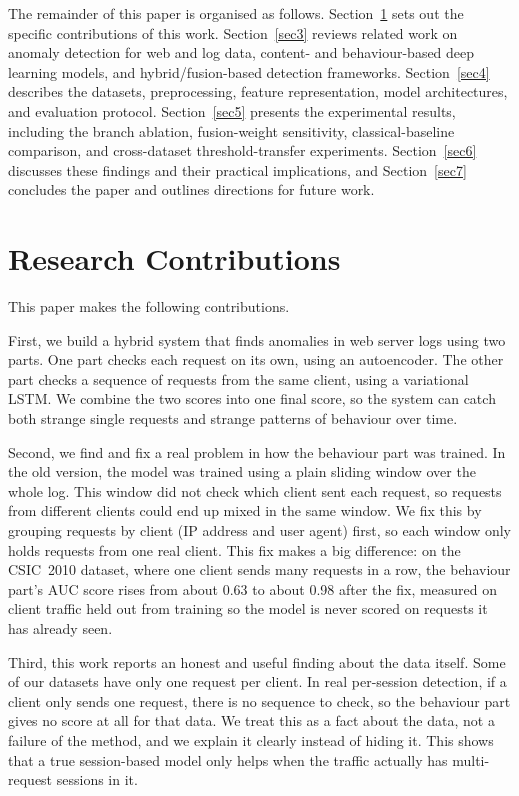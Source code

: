 \documentclass[futureinternet,article,submit,moreauthors]{Definitions/mdpi}
\begin{document}
The remainder of this paper is organised as follows. Section~\ref{sec2} sets out the specific contributions of this work. Section~\ref{sec3} reviews related work on anomaly detection for web and log data, content- and behaviour-based deep learning models, and hybrid/fusion-based detection frameworks. Section~\ref{sec4} describes the datasets, preprocessing, feature representation, model architectures, and evaluation protocol. Section~\ref{sec5} presents the experimental results, including the branch ablation, fusion-weight sensitivity, classical-baseline comparison, and cross-dataset threshold-transfer experiments. Section~\ref{sec6} discusses these findings and their practical implications, and Section~\ref{sec7} concludes the paper and outlines directions for future work.

\section{Research Contributions} \label{sec2}

This paper makes the following contributions.

First, we build a hybrid system that finds anomalies in web server logs using two parts. One part checks each request on its own, using an autoencoder. The other part checks a sequence of requests from the same client, using a variational LSTM. We combine the two scores into one final score, so the system can catch both strange single requests and strange patterns of behaviour over time.

Second, we find and fix a real problem in how the behaviour part was trained. In the old version, the model was trained using a plain sliding window over the whole log. This window did not check which client sent each request, so requests from different clients could end up mixed in the same window. We fix this by grouping requests by client (IP address and user agent) first, so each window only holds requests from one real client. This fix makes a big difference: on the CSIC~2010 dataset, where one client sends many requests in a row, the behaviour part's AUC score rises from about 0.63 to about 0.98 after the fix, measured on client traffic held out from training so the model is never scored on requests it has already seen.

Third, this work reports an honest and useful finding about the data itself. Some of our datasets have only one request per client. In real per-session detection, if a client only sends one request, there is no sequence to check, so the behaviour part gives no score at all for that data. We treat this as a fact about the data, not a failure of the method, and we explain it clearly instead of hiding it. This shows that a true session-based model only helps when the traffic actually has multi-request sessions in it.
\end{document}
